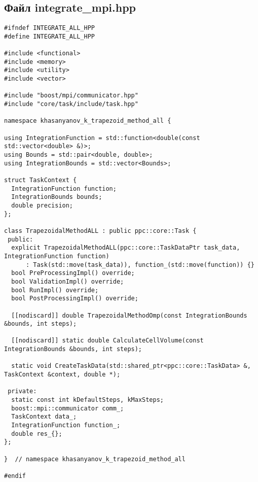 \documentclass[a4paper,12pt]{article}
\begin{document}
\subsection*{Файл integrate\_mpi.hpp}
\begin{lstlisting}
#ifndef INTEGRATE_ALL_HPP
#define INTEGRATE_ALL_HPP

#include <functional>
#include <memory>
#include <utility>
#include <vector>

#include "boost/mpi/communicator.hpp"
#include "core/task/include/task.hpp"

namespace khasanyanov_k_trapezoid_method_all {

using IntegrationFunction = std::function<double(const std::vector<double> &)>;
using Bounds = std::pair<double, double>;
using IntegrationBounds = std::vector<Bounds>;

struct TaskContext {
  IntegrationFunction function;
  IntegrationBounds bounds;
  double precision;
};

class TrapezoidalMethodALL : public ppc::core::Task {
 public:
  explicit TrapezoidalMethodALL(ppc::core::TaskDataPtr task_data, IntegrationFunction function)
      : Task(std::move(task_data)), function_(std::move(function)) {}
  bool PreProcessingImpl() override;
  bool ValidationImpl() override;
  bool RunImpl() override;
  bool PostProcessingImpl() override;

  [[nodiscard]] double TrapezoidalMethodOmp(const IntegrationBounds &bounds, int steps);

  [[nodiscard]] static double CalculateCellVolume(const IntegrationBounds &bounds, int steps);

  static void CreateTaskData(std::shared_ptr<ppc::core::TaskData> &, TaskContext &context, double *);

 private:
  static const int kDefaultSteps, kMaxSteps;
  boost::mpi::communicator comm_;
  TaskContext data_;
  IntegrationFunction function_;
  double res_{};
};

}  // namespace khasanyanov_k_trapezoid_method_all

#endif
\end{lstlisting}
\end{document}
